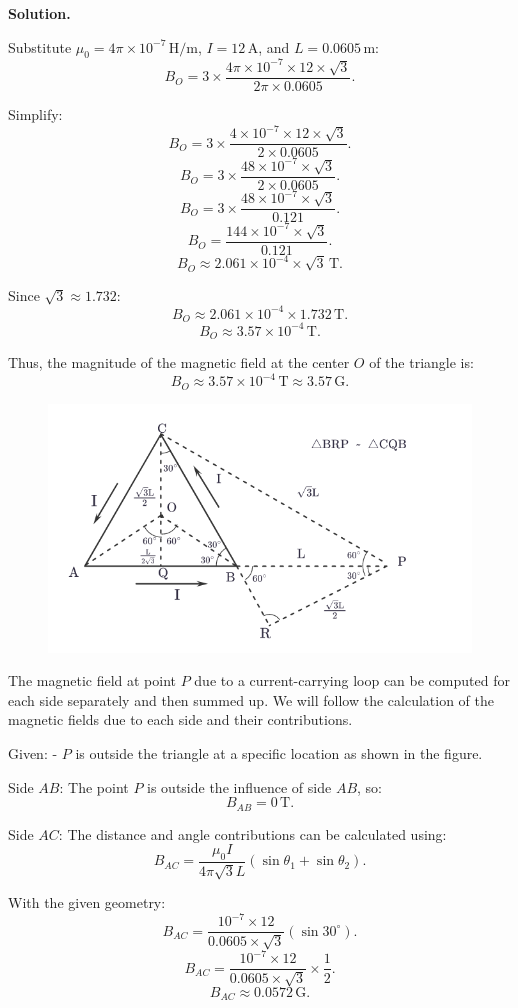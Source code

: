 \documentclass[12pt, a4paper, oneside]{report}
\newenvironment{solution}{
  \par\medskip\noindent
  \textbf{Solution.}\quad\itshape
  \par\noindent\makebox[\linewidth]{\rule{\textwidth}{0.4pt}}
}{
  \par\noindent\makebox[\linewidth]{\rule{\textwidth}{0.4pt}}
  \par\medskip
}
\begin{document}
\begin{solution}
Substitute \(\mu_0 = 4 \pi \times 10^{-7} \, \text{H/m}\), \(I = 12 \, \text{A}\), and \(L = 0.0605 \, \text{m}\):
\[
B_O = 3 \times \frac{4 \pi \times 10^{-7} \times 12 \times \sqrt{3}}{2 \pi \times 0.0605}.
\]

Simplify:
\[
B_O = 3 \times \frac{4 \times 10^{-7} \times 12 \times \sqrt{3}}{2 \times 0.0605}.
\]
\[
B_O = 3 \times \frac{48 \times 10^{-7} \times \sqrt{3}}{2 \times 0.0605}.
\]
\[
B_O = 3 \times \frac{48 \times 10^{-7} \times \sqrt{3}}{0.121}.
\]
\[
B_O = \frac{144 \times 10^{-7} \times \sqrt{3}}{0.121}.
\]
\[
B_O \approx 2.061 \times 10^{-4} \times \sqrt{3} \, \text{T}.
\]

Since \(\sqrt{3} \approx 1.732\):
\[
B_O \approx 2.061 \times 10^{-4} \times 1.732 \, \text{T}.
\]
\[
B_O \approx 3.57 \times 10^{-4} \, \text{T}.
\]

Thus, the magnitude of the magnetic field at the center \(O\) of the triangle is:
\[
B_O \approx 3.57 \times 10^{-4} \, \text{T} \approx 3.57 \, \text{G}.
\]




\begin{figure}[ht!]
    \centering
    \includegraphics[width=0.5\linewidth]{12.png}
    \caption{}
    \label{fig:enter-label}
\end{figure}


The magnetic field at point \(P\) due to a current-carrying loop can be computed for each side separately and then summed up. We will follow the calculation of the magnetic fields due to each side and their contributions.

Given:
- \(P\) is outside the triangle at a specific location as shown in the figure.


Side \(AB\):
   The point \(P\) is outside the influence of side \(AB\), so:
   \[
   B_{AB} = 0 \, \text{T}.
   \]

Side \(AC\):
   The distance and angle contributions can be calculated using:
   \[
   B_{AC} = \frac{\mu_0 I}{4 \pi \sqrt{3} L} (\sin \theta_1 + \sin \theta_2).
   \]

   With the given geometry:
   \[
   B_{AC} = \frac{10^{-7} \times 12}{0.0605 \times \sqrt{3}} (\sin 30^\circ).
   \]
   \[
   B_{AC} = \frac{10^{-7} \times 12}{0.0605 \times \sqrt{3}} \times \frac{1}{2}.
   \]
   \[
   B_{AC} \approx 0.0572 \, \text{G}.
   \]


\end{solution}
\end{document}
